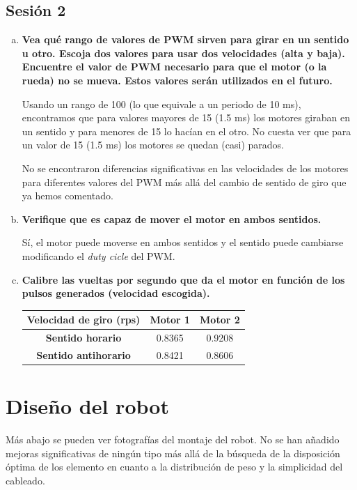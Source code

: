 \documentclass[11pt, a4paper]{article}
\begin{document}
\subsection{Sesión 2}
	\begin{enumerate}[(a)]
			\item \textbf{Vea qué rango de valores de PWM sirven para girar en un sentido u otro. Escoja dos valores para usar dos velocidades (alta y baja). Encuentre el valor de PWM necesario para que el motor (o la rueda) no se mueva. Estos valores serán utilizados en el futuro.}

			Usando un rango de 100 (lo que equivale a un periodo de 10 ms), encontramos que para valores mayores de 15 (1.5 ms) los motores giraban en un sentido y para menores de 15 lo hacían en el otro. No cuesta ver que para un valor de 15 (1.5 ms) los motores se quedan (casi) parados.
			
			No se encontraron diferencias significativas en las velocidades de los motores para diferentes valores del PWM más allá del cambio de sentido de giro que ya hemos comentado.
			
			\item \textbf{Verifique que es capaz de mover el motor en ambos sentidos.}
			
			Sí, el motor puede moverse en ambos sentidos y el sentido puede cambiarse modificando el \textit{duty cicle} del PWM.
			
			\item \textbf{Calibre las vueltas por segundo que da el motor en función de los pulsos generados (velocidad escogida).}
			
			\begin{center}
			\begin{tabular}{ c | c c }
			 \textbf{Velocidad de giro (rps)} & \textbf{Motor 1} & \textbf{Motor 2} \\ 
			 \hline
			 \textbf{Sentido horario} & 0.8365 & 0.9208 \\  
			 \textbf{Sentido antihorario} & 0.8421 & 0.8606  
			\end{tabular}
			\end{center}
		\end{enumerate}
		
	\section{Diseño del robot}
	
	Más abajo se pueden ver fotografías del montaje del robot. No se han añadido mejoras significativas de ningún tipo más allá de la búsqueda de la disposición óptima de los elemento en cuanto a la distribución de peso y la simplicidad del cableado.
	
\end{document}
